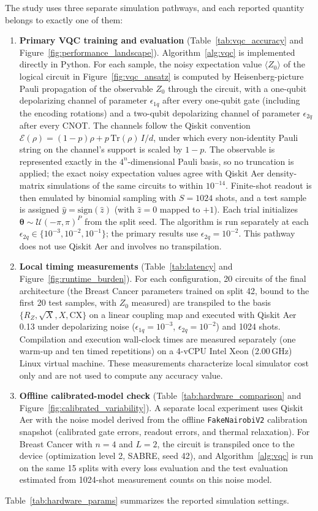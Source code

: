 \documentclass[final,5p,times,number]{elsarticle}
\begin{document}
The study uses three separate simulation pathways, and each reported quantity belongs to exactly one of them:
\begin{enumerate}[leftmargin=*,label=(\roman*)]
  \item \textbf{Primary VQC training and evaluation} (Table~\ref{tab:vqc_accuracy} and Figure~\ref{fig:performance_landscape}). Algorithm~\ref{alg:vqc} is implemented directly in Python. For each sample, the noisy expectation value $\langle Z_0\rangle$ of the logical circuit in Figure~\ref{fig:vqc_ansatz} is computed by Heisenberg-picture Pauli propagation of the observable $Z_0$ through the circuit, with a one-qubit depolarizing channel of parameter $\epsilon_{1q}$ after every one-qubit gate (including the encoding rotations) and a two-qubit depolarizing channel of parameter $\epsilon_{2q}$ after every CNOT. The channels follow the Qiskit convention $\mathcal{E}(\rho)=(1-p)\rho+p\,\mathrm{Tr}(\rho)\,I/d$, under which every non-identity Pauli string on the channel's support is scaled by $1-p$. The observable is represented exactly in the $4^n$-dimensional Pauli basis, so no truncation is applied; the exact noisy expectation values agree with Qiskit Aer density-matrix simulations of the same circuits to within $10^{-14}$. Finite-shot readout is then emulated by binomial sampling with $S=1024$ shots, and a test sample is assigned $\hat{y}=\mathrm{sign}(\hat{z})$ (with $\hat{z}=0$ mapped to $+1$). Each trial initializes $\boldsymbol{\theta}\sim\mathcal{U}(-\pi,\pi)^P$ from the split seed. The algorithm is run separately at each $\epsilon_{2q}\in\{10^{-3},10^{-2},10^{-1}\}$; the primary results use $\epsilon_{2q}=10^{-2}$. This pathway does not use Qiskit Aer and involves no transpilation.
  \item \textbf{Local timing measurements} (Table~\ref{tab:latency} and Figure~\ref{fig:runtime_burden}). For each configuration, 20 circuits of the final architecture (the Breast Cancer parameters trained on split 42, bound to the first 20 test samples, with $Z_0$ measured) are transpiled to the basis $\{R_Z,\sqrt{X},X,\mathrm{CX}\}$ on a linear coupling map and executed with Qiskit Aer 0.13 under depolarizing noise ($\epsilon_{1q}=10^{-3}$, $\epsilon_{2q}=10^{-2}$) and 1024 shots. Compilation and execution wall-clock times are measured separately (one warm-up and ten timed repetitions) on a 4-vCPU Intel Xeon (2.00\,GHz) Linux virtual machine. These measurements characterize local simulator cost only and are not used to compute any accuracy value.
  \item \textbf{Offline calibrated-model check} (Table~\ref{tab:hardware_comparison} and Figure~\ref{fig:calibrated_variability}). A separate local experiment uses Qiskit Aer with the noise model derived from the offline \texttt{FakeNairobiV2} calibration snapshot (calibrated gate errors, readout errors, and thermal relaxation). For Breast Cancer with $n=4$ and $L=2$, the circuit is transpiled once to the device (optimization level 2, SABRE, seed 42), and Algorithm~\ref{alg:vqc} is run on the same 15 splits with every loss evaluation and the test evaluation estimated from 1024-shot measurement counts on this noise model.
\end{enumerate}
Table~\ref{tab:hardware_params} summarizes the reported simulation settings.
\end{document}
